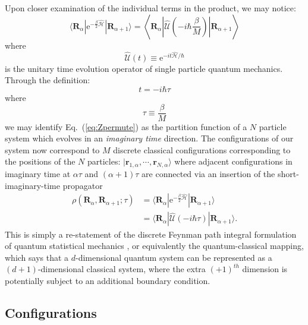 \documentclass[prb,10pt,aps,floatfix,notitlepage]{revtex4-1}
\renewcommand{\vec}[1]{\boldsymbol{#1}}
\newcommand{\e}[1]{\mathrm{e}^{#1}}
\renewcommand{\eqref}[1]{Eq.~(\ref{#1})}
\newcommand{\R}{\vec{R}}
\begin{document}
Upon closer examination of the individual terms in the product, we may notice:
%
\begin{equation}
    \langle \R_\alpha | \e{-\frac{\beta}{2}\hat{\mathcal{H}}} | \R_{\alpha+1}
    \rangle = 
    \left \langle \R_\alpha \left | \hat{\mathcal{U}}\left(-i \hbar
    \frac{\beta}{M}\right) \right | \R_{\alpha+1}
    \right \rangle 
\end{equation}
%
where 
%
\begin{equation}
    \hat{\mathcal{U}}(t) \equiv \e{-{i t} \hat{\mathcal{H}}/\hbar}
\end{equation}
%
is the unitary time evolution operator of single particle quantum mechanics.
Through the definition:
%
\begin{equation}
t = - i \hbar \tau
\end{equation}
%
where 
%
\begin{equation}
    \tau \equiv \frac{\beta}{M}
\end{equation}
%
we may identify \eqref{eq:Zpermute} as the partition function of a $N$
particle system which evolves in an \emph{imaginary time} direction. The
configurations of our system now correspond to $M$ discrete classical configurations
corresponding to the positions of the $N$ particles:
$|\vec{r}_{1,\alpha},\cdots,\vec{r}_{N,\alpha}\rangle$ where adjacent configurations
in imaginary time at $\alpha \tau$ and $(\alpha+1)\tau$ are connected via an
insertion of the short-imaginary-time propagator 
\begin{align*}
    \rho(\R_\alpha,\R_{\alpha+1};\tau) 
    &= \langle \R_\alpha| \e{-\frac{\beta}{2}\hat{\mathcal{H}}} | \R_{\alpha+1} \rangle 
     \\ 
     &= \langle \R_\alpha| \hat{\mathcal{U}}(-i \hbar \tau) | \R_{\alpha+1} \rangle.
\end{align*}
This is simply a re-statement of the discrete Feynman path integral
formulation of quantum statistical mechanics \cite{feynman1965quantum}, or
equivalently the quantum-classical mapping, which says that a $d$-dimensional
quantum system can be represented as a $(d+1)$-dimensional classical system,
where the extra $(+1)^{th}$ dimension is potentially subject to an additional
boundary condition.

\subsection{Configurations}
\label{sec:configurations}
\end{document}
